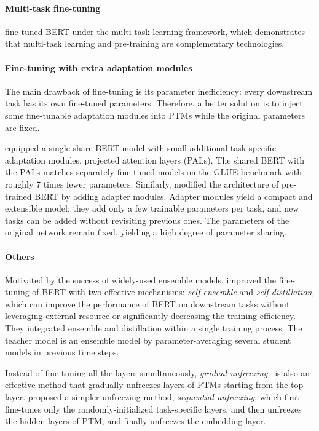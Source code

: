 \documentclass[fleqn]{SCYE-arxiv}
\begin{document}
\begin{multicols}{2}
\paragraph{Multi-task fine-tuning}
\citet{liu2019multi} fine-tuned BERT under the multi-task learning framework, which demonstrates that multi-task learning and pre-training are complementary technologies.

\paragraph{Fine-tuning with extra adaptation modules}

The main drawback of fine-tuning is its parameter inefficiency: every downstream task has its own fine-tuned parameters.
Therefore, a better solution is to inject some fine-tunable adaptation modules into PTMs while the original parameters are fixed.

\citet{stickland2019bert} equipped a single share BERT model with small additional task-specific adaptation modules, projected attention layers (PALs). The shared BERT with the PALs matches separately fine-tuned models on the GLUE benchmark with roughly 7 times fewer parameters.
Similarly, \citet{houlsby2019parameter} modified the architecture of pre-trained BERT by adding adapter modules. Adapter modules yield a compact and extensible model; they add only a few trainable parameters per task, and new tasks can be added without revisiting previous ones. The parameters of the original network remain fixed, yielding a high degree of parameter sharing.

\paragraph{Others}

Motivated by the success of widely-used ensemble models, \citet{xu2020improving} improved the fine-tuning of BERT with two effective mechanisms: \textit{self-ensemble} and \textit{self-distillation}, which can improve the performance of BERT on downstream tasks without leveraging external resource or significantly decreasing the training efficiency.
They integrated ensemble and distillation within a single training process. The teacher model is an ensemble model by parameter-averaging several student models in previous time steps.

Instead of fine-tuning all the layers simultaneously, \textit{gradual unfreezing}~\cite{DBLP:conf/acl/RuderH18} is also an effective method that gradually unfreezes layers of PTMs starting from the top layer.
\citet{chronopoulou2019embarrassingly} proposed a simpler unfreezing method, \textit{sequential unfreezing}, which first fine-tunes only the randomly-initialized task-specific layers, and then unfreezes the hidden layers of PTM, and finally unfreezes the embedding layer.


\end{multicols}
\end{document}
